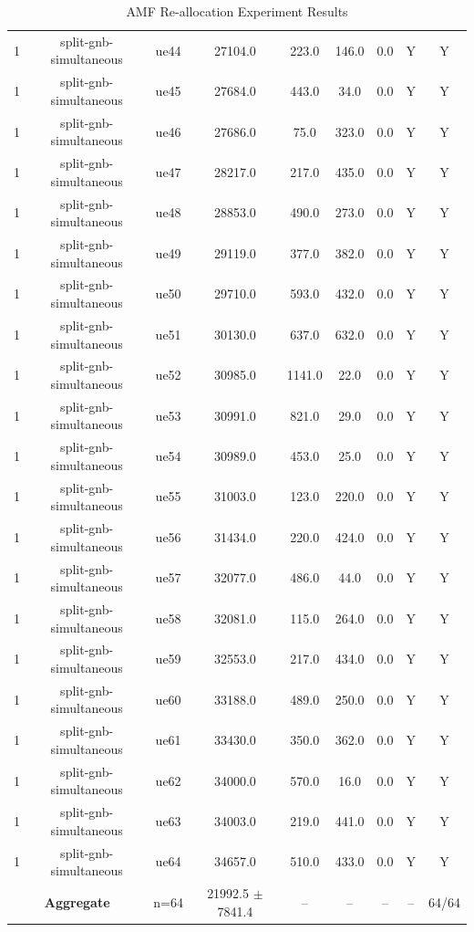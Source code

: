\begin{table}[ht]
\begin{tabular}{|c|c|c|c|c|c|c|c|c|}
1 & split-gnb-simultaneous & ue44 & 27104.0 & 223.0 & 146.0 & 0.0 & Y & Y \\
1 & split-gnb-simultaneous & ue45 & 27684.0 & 443.0 & 34.0 & 0.0 & Y & Y \\
1 & split-gnb-simultaneous & ue46 & 27686.0 & 75.0 & 323.0 & 0.0 & Y & Y \\
1 & split-gnb-simultaneous & ue47 & 28217.0 & 217.0 & 435.0 & 0.0 & Y & Y \\
1 & split-gnb-simultaneous & ue48 & 28853.0 & 490.0 & 273.0 & 0.0 & Y & Y \\
1 & split-gnb-simultaneous & ue49 & 29119.0 & 377.0 & 382.0 & 0.0 & Y & Y \\
1 & split-gnb-simultaneous & ue50 & 29710.0 & 593.0 & 432.0 & 0.0 & Y & Y \\
1 & split-gnb-simultaneous & ue51 & 30130.0 & 637.0 & 632.0 & 0.0 & Y & Y \\
1 & split-gnb-simultaneous & ue52 & 30985.0 & 1141.0 & 22.0 & 0.0 & Y & Y \\
1 & split-gnb-simultaneous & ue53 & 30991.0 & 821.0 & 29.0 & 0.0 & Y & Y \\
1 & split-gnb-simultaneous & ue54 & 30989.0 & 453.0 & 25.0 & 0.0 & Y & Y \\
1 & split-gnb-simultaneous & ue55 & 31003.0 & 123.0 & 220.0 & 0.0 & Y & Y \\
1 & split-gnb-simultaneous & ue56 & 31434.0 & 220.0 & 424.0 & 0.0 & Y & Y \\
1 & split-gnb-simultaneous & ue57 & 32077.0 & 486.0 & 44.0 & 0.0 & Y & Y \\
1 & split-gnb-simultaneous & ue58 & 32081.0 & 115.0 & 264.0 & 0.0 & Y & Y \\
1 & split-gnb-simultaneous & ue59 & 32553.0 & 217.0 & 434.0 & 0.0 & Y & Y \\
1 & split-gnb-simultaneous & ue60 & 33188.0 & 489.0 & 250.0 & 0.0 & Y & Y \\
1 & split-gnb-simultaneous & ue61 & 33430.0 & 350.0 & 362.0 & 0.0 & Y & Y \\
1 & split-gnb-simultaneous & ue62 & 34000.0 & 570.0 & 16.0 & 0.0 & Y & Y \\
1 & split-gnb-simultaneous & ue63 & 34003.0 & 219.0 & 441.0 & 0.0 & Y & Y \\
1 & split-gnb-simultaneous & ue64 & 34657.0 & 510.0 & 433.0 & 0.0 & Y & Y \\
\multicolumn{2}{|c|}{\textbf{Aggregate}} & n=64 & 21992.5 $\pm$ 7841.4 & -- & -- & -- & -- & 64/64 \\
\hline
\end{tabular}
\caption{AMF Re-allocation Experiment Results}
\label{tab:amf_realloc}
\end{table}
